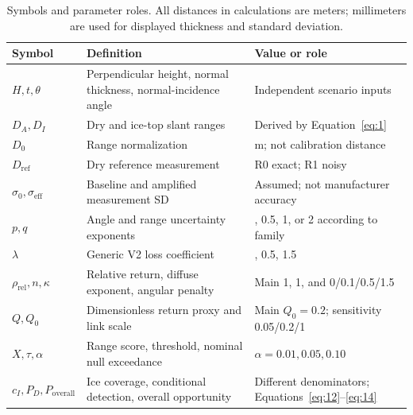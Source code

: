 \begin{table}[htbp]
\caption{Symbols and parameter roles. All distances in calculations are meters; millimeters are used for displayed thickness and standard deviation.}\label{tab:2}
\small\setlength{\tabcolsep}{3pt}\renewcommand{\arraystretch}{1.15}
\begin{tabularx}{\linewidth}{>{\raggedright\arraybackslash}X>{\raggedright\arraybackslash}X>{\raggedright\arraybackslash}X}
\toprule
Symbol & Definition & Value or role \\
\midrule
$H,t,\theta$ & Perpendicular height, normal thickness, normal-incidence angle & Independent scenario inputs \\
$D_A,D_I$ & Dry and ice-top slant ranges & Derived by Equation~\eqref{eq:1} \\
$D_0$ & Range normalization & 1.6 m; not calibration distance \\
$D_{\mathrm{ref}}$ & Dry reference measurement & R0 exact; R1 noisy \\
$\sigma_0,\sigma_{\mathrm{eff}}$ & Baseline and amplified measurement SD & Assumed; not manufacturer accuracy \\
$p,q$ & Angle and range uncertainty exponents & 0, 0.5, 1, or 2 according to family \\
$\lambda$ & Generic V2 loss coefficient & 0.15, 0.5, 1.5 \\
$\rho_{\mathrm{rel}},n,\kappa$ & Relative return, diffuse exponent, angular penalty & Main 1, 1, and 0/0.1/0.5/1.5 \\
$Q,Q_0$ & Dimensionless return proxy and link scale & Main $Q_0=0.2$; sensitivity 0.05/0.2/1 \\
$X,\tau,\alpha$ & Range score, threshold, nominal null exceedance & $\alpha=0.01,0.05,0.10$ \\
$c_I,P_D,P_{\mathrm{overall}}$ & Ice coverage, conditional detection, overall opportunity & Different denominators; Equations~\eqref{eq:12}--\eqref{eq:14} \\
\bottomrule
\end{tabularx}
\end{table}
